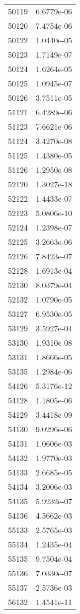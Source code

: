\begin{table}[h!]
\begin{tabular}{|| c || c |}
50119 & 6.6779e-06 \\
50120 & 7.4754e-06 \\
50122 & 1.0440e-05 \\
50123 & 1.7149e-07 \\
50124 & 1.6264e-05 \\
50125 & 1.0945e-07 \\
50126 & 3.7511e-05 \\
51121 & 6.4289e-06 \\
51123 & 7.6621e-06 \\
51124 & 3.4270e-08 \\
51125 & 1.4380e-05 \\
51126 & 1.2950e-08 \\
52120 & 1.3027e-18 \\
52122 & 1.4433e-07 \\
52123 & 5.0806e-10 \\
52124 & 1.2398e-07 \\
52125 & 3.2663e-06 \\
52126 & 7.8423e-07 \\
52128 & 1.6913e-04 \\
52130 & 8.0379e-04 \\
52132 & 1.0790e-05 \\
53127 & 6.9530e-05 \\
53129 & 3.5927e-04 \\
53130 & 1.9310e-08 \\
53131 & 1.8666e-05 \\
53135 & 1.2984e-06 \\
54126 & 5.3176e-12 \\
54128 & 1.1805e-06 \\
54129 & 3.4418e-09 \\
54130 & 9.0296e-06 \\
54131 & 1.0606e-03 \\
54132 & 1.9770e-03 \\
54133 & 2.6685e-05 \\
54134 & 3.2006e-03 \\
54135 & 5.9232e-07 \\
54136 & 4.5662e-03 \\
55133 & 2.5765e-03 \\
55134 & 1.2435e-04 \\
55135 & 9.7504e-04 \\
55136 & 7.0330e-07 \\
55137 & 2.5736e-03 \\
56132 & 1.4541e-11 \\

\end{tabular}
\end{table}
